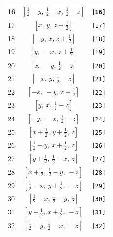 \documentclass[fleqn,8pt]{jsarticle}
\begin{document}
\begin{longtable}{ccc}
16 & $\left[ \frac{1}{2} - y,\, \frac{1}{2} - x,\, \frac{1}{2} - z \right]$ & {\tt [16]} \\ \hline
17 & $\left[ x,\, y,\, z + \frac{1}{2} \right]$ & {\tt [17]} \\ \hline
18 & $\left[ - y,\, x,\, z + \frac{1}{2} \right]$ & {\tt [18]} \\ \hline
19 & $\left[ y,\, - x,\, z + \frac{1}{2} \right]$ & {\tt [19]} \\ \hline
20 & $\left[ x,\, - y,\, \frac{1}{2} - z \right]$ & {\tt [20]} \\ \hline
21 & $\left[ - x,\, y,\, \frac{1}{2} - z \right]$ & {\tt [21]} \\ \hline
22 & $\left[ - x,\, - y,\, z + \frac{1}{2} \right]$ & {\tt [22]} \\ \hline
23 & $\left[ y,\, x,\, \frac{1}{2} - z \right]$ & {\tt [23]} \\ \hline
24 & $\left[ - y,\, - x,\, \frac{1}{2} - z \right]$ & {\tt [24]} \\ \hline
25 & $\left[ x + \frac{1}{2},\, y + \frac{1}{2},\, z \right]$ & {\tt [25]} \\ \hline
26 & $\left[ \frac{1}{2} - y,\, x + \frac{1}{2},\, z \right]$ & {\tt [26]} \\ \hline
27 & $\left[ y + \frac{1}{2},\, \frac{1}{2} - x,\, z \right]$ & {\tt [27]} \\ \hline
28 & $\left[ x + \frac{1}{2},\, \frac{1}{2} - y,\, - z \right]$ & {\tt [28]} \\ \hline
29 & $\left[ \frac{1}{2} - x,\, y + \frac{1}{2},\, - z \right]$ & {\tt [29]} \\ \hline
30 & $\left[ \frac{1}{2} - x,\, \frac{1}{2} - y,\, z \right]$ & {\tt [30]} \\ \hline
31 & $\left[ y + \frac{1}{2},\, x + \frac{1}{2},\, - z \right]$ & {\tt [31]} \\ \hline
32 & $\left[ \frac{1}{2} - y,\, \frac{1}{2} - x,\, - z \right]$ & {\tt [32]} \\
\end{longtable}
\end{document}
